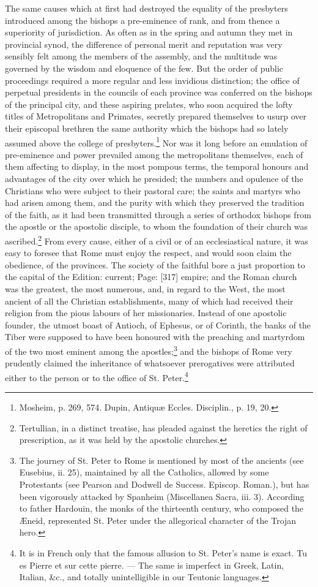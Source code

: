The same causes which at first had destroyed the equality of the presbyters introduced among the bishops a pre-eminence of rank, and from thence a superiority of jurisdiction. As often as in the spring and autumn they met in provincial synod, the difference of personal merit and reputation was very sensibly felt among the members of the assembly, and the multitude was governed by the wisdom and eloquence of the few. But the order of public proceedings required a more regular and less invidious distinction; the office of perpetual presidents in the councils of each province was conferred on the bishops of the principal city, and these aspiring prelates, who soon acquired the lofty titles of Metropolitans and Primates, secretly prepared themselves to usurp over their episcopal brethren the same authority which the bishops had so lately assumed above the college of presbyters.\footnote{Mosheim, p. 269, 574. Dupin, Antiquæ Eccles. Disciplin., p. 19, 20.} Nor was it long before an emulation of pre-eminence and power prevailed among the metropolitans themselves, each of them affecting to display, in the most pompous terms, the temporal honours and advantages of the city over which he presided; the numbers and opulence of the Christians who were subject to their pastoral care; the saints and martyrs who had arisen among them, and the purity with which they preserved the tradition of the faith, as it had been transmitted through a series of orthodox bishops from the apostle or the apostolic disciple, to whom the foundation of their church was ascribed.\footnote{Tertullian, in a distinct treatise, has pleaded against the heretics the right of prescription, as it was held by the apostolic churches.} From every cause, either of a civil or of an ecclesiastical nature, it was easy to foresee that Rome must enjoy the respect, and would soon claim the obedience, of the provinces. The society of the faithful bore a just proportion to the capital of the Edition: current; Page: [317] empire; and the Roman church was the greatest, the most numerous, and, in regard to the West, the most ancient of all the Christian establishments, many of which had received their religion from the pious labours of her missionaries. Instead of one apostolic founder, the utmost boast of Antioch, of Ephesus, or of Corinth, the banks of the Tiber were supposed to have been honoured with the preaching and martyrdom of the two most eminent among the apostles;\footnote{The journey of St. Peter to Rome is mentioned by most of the ancients (see Eusebius, ii. 25), maintained by all the Catholics, allowed by some Protestants (see Pearson and Dodwell de Success. Episcop. Roman.), but has been vigorously attacked by Spanheim (Miscellanea Sacra, iii. 3). According to father Hardouin, the monks of the thirteenth century, who composed the Æneid, represented St. Peter under the allegorical character of the Trojan hero.} and the bishops of Rome very prudently claimed the inheritance of whatsoever prerogatives were attributed either to the person or to the office of St. Peter.\footnote{It is in French only that the famous allusion to St. Peter\texthebrew{}’s name is exact. Tu es Pierre et sur cette pierre. \texthebrew{—} The same is imperfect in Greek, Latin, Italian, \&c., and totally unintelligible in our Teutonic languages.} 